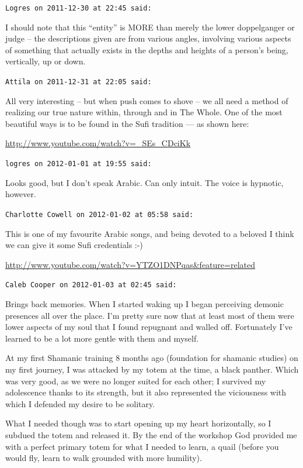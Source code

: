 \begin{footnotesize}
\begin{sffamily}
\texttt{Logres on 2011-12-30 at 22:45 said:}

I should note that this ``entity'' is MORE than merely the lower doppelganger or judge -- the descriptions given are from various angles, involving various aspects of something that actually exists in the depths and heights of a person's being, vertically, up or down.

\hfill

\texttt{Attila on 2011-12-31 at 22:05 said:}

All very interesting -- but when push comes to shove -- we all need a method of realizing our true nature within, through and in The Whole. One of the most beautiful ways is to be found in the Sufi tradition --- as shown here:

\url{http://www.youtube.com/watch?v=\_SEs\_CDciKk}


\hfill

\texttt{logres on 2012-01-01 at 19:55 said:}

Looks good, but I don't speak Arabic. Can only intuit. The voice is hypnotic, however.

\hfill

\texttt{Charlotte Cowell on 2012-01-02 at 05:58 said:}

This is one of my favourite Arabic songs, and being devoted to a beloved I think we can give it some Sufi credentials :-)

\url{http://www.youtube.com/watch?v=YTZO1DNPqas\&feature=related}


\hfill

\texttt{Caleb Cooper on 2012-01-03 at 02:45 said:}

Brings back memories. When I started waking up I began perceiving demonic presences all over the place. I'm pretty sure now that at least most of them were lower aspects of my soul that I found repugnant and walled off. Fortunately I've learned to be a lot more gentle with them and myself.

At my first Shamanic training 8 months ago (foundation for shamanic studies) on my first journey, I was attacked by my totem at the time, a black panther. Which was very good, as we were no longer suited for each other; I survived my adolescence thanks to its strength, but it also represented the viciousness with which I defended my desire to be solitary.

What I needed though was to start opening up my heart horizontally, so I subdued the totem and released it. By the end of the workshop God provided me with a perfect primary totem for what I needed to learn, a quail (before you would fly, learn to walk grounded with more humility).


\end{sffamily}
\end{footnotesize}
